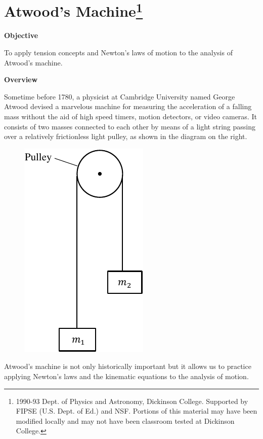
\section{Atwood's Machine\footnote{
1990-93 Dept. of Physics and Astronomy, Dickinson College. Supported by FIPSE
(U.S. Dept. of Ed.) and NSF. Portions of this material may have been modified
locally and may not have been classroom tested at Dickinson College.
}}

\makelabheader %

\textbf{Objective }

To apply tension concepts and Newton's laws of motion to the analysis of Atwood's
machine.

\textbf{Overview }

Sometime before 1780, a physicist at Cambridge University named George Atwood
devised a marvelous machine for measuring the acceleration of a falling mass
without the aid of high speed timers, motion detectors, or video cameras. It
consists of two masses connected to each other by means of a light string passing
over a relatively frictionless light pulley, as shown in the diagram on the right.


\begin{figure}
\vspace{-0.8cm}
\begin{center}
    \includegraphics{atwood/atwood_fig.pdf}
\end{center}
\end{figure}
Atwood's machine is not only historically important but it allows us to practice
applying Newton's laws and the kinematic equations to the analysis of motion.


